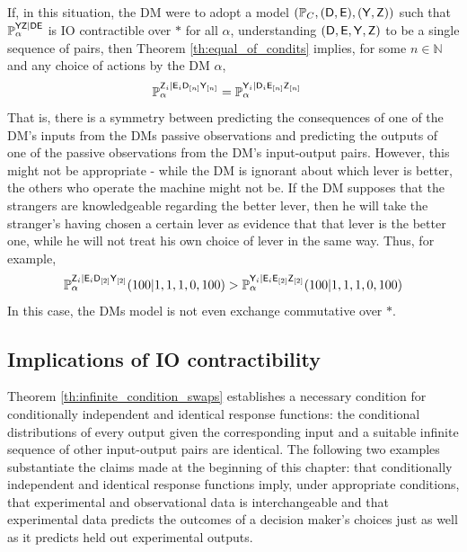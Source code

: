 If, in this situation, the DM were to adopt a model $(\mathbb{P}_C,(\mathsf{D},\mathsf{E}),(\mathsf{Y},\mathsf{Z}))$ such that $\mathbb{P}_\alpha^{\mathsf{YZ}|\mathsf{DE}}$ is IO contractible over $*$ for all $\alpha$, understanding $(\mathsf{D},\mathsf{E},\mathsf{Y},\mathsf{Z})$ to be a single sequence of pairs, then Theorem \ref{th:equal_of_condits} implies, for some $n\in\mathbb{N}$ and any choice of actions by the DM $\alpha$,
\begin{align}
    \mathbb{P}_\alpha^{\mathsf{Z}_i|\mathsf{E}_i\mathsf{D}_{[n]}\mathsf{Y}_{[n]}} &= \mathbb{P}_\alpha^{\mathsf{Y}_i|\mathsf{D}_i\mathsf{E}_{[n]}\mathsf{Z}_{[n]}}
\end{align}
That is, there is a symmetry between predicting the consequences of one of the DM's inputs from the DMs passive observations and predicting the outputs of one of the passive observations from the DM's input-output pairs. However, this might not be appropriate - while the DM is ignorant about which lever is better, the others who operate the machine might not be. If the DM supposes that the strangers are knowledgeable regarding the better lever, then he will take the stranger's having chosen a certain lever as evidence that that lever is the better one, while he will not treat his own choice of lever in the same way. Thus, for example,
\begin{align}
    \mathbb{P}_\alpha^{\mathsf{Z}_i|\mathsf{E}_i\mathsf{D}_{[2]}\mathsf{Y}_{[2]}}(100|1,1,1,0,100) > \mathbb{P}_\alpha^{\mathsf{Y}_i|\mathsf{E}_i\mathsf{E}_{[2]}\mathsf{Z}_{[2]}}(100|1,1,1,0,100)
\end{align}
In this case, the DMs model is not even exchange commutative over $*$.

\subsection{Implications of IO contractibility}\label{sec:imp_iocont}

Theorem \ref{th:infinite_condition_swaps} establishes a necessary condition for conditionally independent and identical response functions: the conditional distributions of every output given the corresponding input and a suitable infinite sequence of other input-output pairs are identical. The following two examples substantiate the claims made at the beginning of this chapter: that conditionally independent and identical response functions imply, under appropriate conditions, that experimental and observational data is interchangeable and that experimental data predicts the outcomes of a decision maker's choices just as well as it predicts held out experimental outputs.

